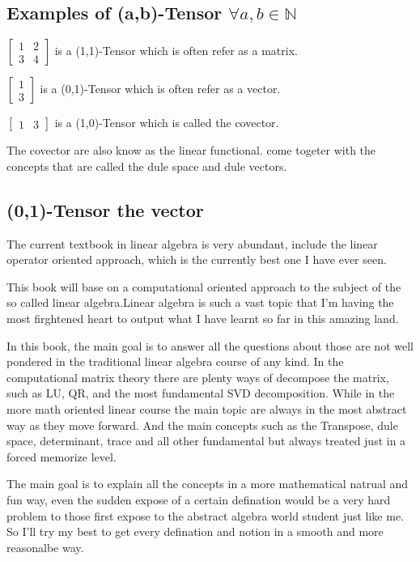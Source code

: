 \documentclass{book}
\begin{document}
\subsection{Examples of (a,b)-Tensor $\forall a,b \in \mathbb{N}$}

$\left[\begin{matrix}
            1 & 2 \\
            3 & 4
        \end{matrix}\right]$
is a (1,1)-Tensor which is often refer
as a matrix.

$\left[\begin{matrix}
            1 \\
            3
        \end{matrix}\right]$
is a (0,1)-Tensor which is often refer
as a vector.

$\left[\begin{matrix}
            1 & 3
        \end{matrix}\right]$
is a (1,0)-Tensor which is called the covector.

The covector are also know as the linear functional.
come togeter with the concepts that are
called the dule space and dule vectors.

\subsection{(0,1)-Tensor the vector}

The current
textbook in linear algebra is very abundant,
include the linear operator oriented approach,
which is the currently best one I have ever seen.

This book will base on a computational oriented
approach to the subject of the so called linear
algebra.Linear algebra is such a vast topic that
I'm having the most firghtened heart to output
what I have learnt so far in this amazing land.

In this book, the main goal is to answer all the
questions about those are not well pondered in the
traditional linear algebra course of any kind.
In the computational matrix theory there are plenty
ways of decompose the matrix, such as LU, QR, and the
most fundamental SVD decomposition.
While in the more math oriented linear course
the main topic are always in the most abstract way
as they move forward.
And the main concepts such as the Transpose, dule
space, determinant, trace and all other fundamental
but always treated just in a forced memorize level.

The main goal is to explain all the concepts in a
more mathematical natrual and fun way, even the sudden
expose of a certain defination would be a very hard
problem to those first expose to the abstract algebra
world student just like me. So I'll try my best to
get every defination and notion in a smooth and more
reasonalbe way.
\end{document}
